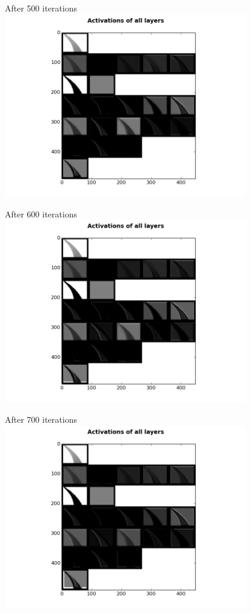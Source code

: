 \begin{frame}{After 500 iterations}
\includegraphics[height=8.0cm]{data/activations/output-500.png}\\ 
\end{frame}

\begin{frame}{After 600 iterations}
\includegraphics[height=8.0cm]{data/activations/output-600.png}\\ 
\end{frame}

\begin{frame}{After 700 iterations}
\includegraphics[height=8.0cm]{data/activations/output-700.png}\\ 
\end{frame}

